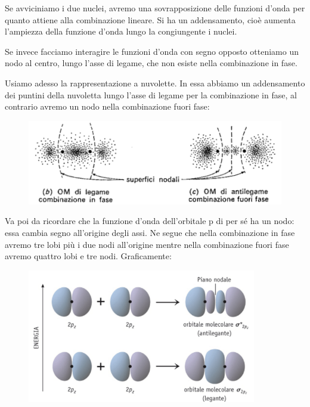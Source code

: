 \vspace{0.2cm}Se avviciniamo i due nuclei, avremo una sovrapposizione delle funzioni d'onda per quanto attiene alla combinazione lineare. Si ha un addensamento, cioè aumenta l'ampiezza della funzione d'onda lungo la congiungente i nuclei.

Se invece facciamo interagire le funzioni d'onda con segno opposto otteniamo un nodo al centro, lungo l'asse di legame, che non esiste nella combinazione in fase.

\vspace{0.2cm}Usiamo adesso la rappresentazione a nuvolette. In essa abbiamo un addensamento dei puntini della nuvoletta lungo l'asse di legame per la combinazione in fase, al contrario avremo un nodo nella combinazione fuori fase:
\newpage
\begin{figure}[htp]
    \centering
    \includegraphics[width=12cm]{immagini/orbitali_molecolari_pigreco_nuvoletta.png}
\end{figure}

Va poi da ricordare che la funzione d'onda dell'orbitale p di per sé ha un nodo: essa cambia segno all'origine degli assi. Ne segue che nella combinazione in fase avremo tre lobi più i due nodi all'origine mentre nella combinazione fuori fase avremo quattro lobi e tre nodi. Graficamente:

\begin{figure}[htp]
    \centering
    \includegraphics[width=10cm]{immagini/orbitali_sigma_p.png}
\end{figure}

